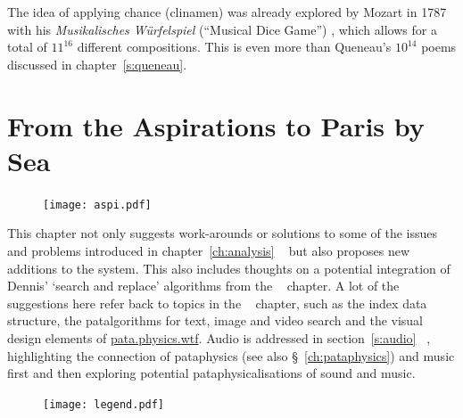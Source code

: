 \documentclass[11pt]{thesis} %
\begin{document}
The idea of applying chance (clinamen) was already explored by Mozart in 1787 with his \textit{Musikalisches W\"{u}rfelspiel} (``Musical Dice Game'') \autocite{Aldenhovelnd}, which allows for a total of $11^{16}$ different compositions. This is even more than Queneau's $10^{14}$ poems discussed in chapter~\ref{s:queneau}.


\section{From the Aspirations to Paris by Sea}

\begin{figure}[!htb]
\centering
  \texttt{[image: aspi.pdf]}
\end{figure}

This chapter not only suggests work-arounds or solutions to some of the issues and problems introduced in chapter~\ref{ch:analysis} \anal~ but also proposes new additions to the system. This also includes thoughts on a potential integration of Dennis' `search and replace' algorithms from the  \appli~ chapter. A lot of the suggestions here refer back to topics in the  \imple~ chapter, such as the index data structure, the patalgorithms for text, image and video search and the visual design elements of \url{pata.physics.wtf}. Audio is addressed in section~\ref{s:audio} \aspi~, highlighting the connection of pataphysics (see also §~\ref{ch:pataphysics}) and music first and then exploring potential pataphysicalisations of sound and music.

\begin{figure}[!htb]
\centering
  \texttt{[image: legend.pdf]}
\end{figure}
\end{document}
